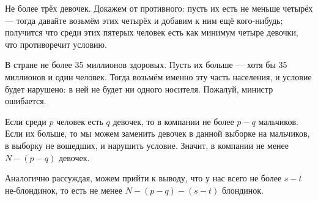 \begin{itemize}
\itA Не более трёх девочек. Докажем от противного: пусть их есть не меньше четырёх --- 
тогда давайте возьмём этих четырёх и добавим к ним ещё кого-нибудь; получится что  
среди этих пятерых человек есть как минимум четыре девочки, что противоречит условию.

\itB В стране не более 35 миллионов здоровых. Пусть их больше --- хотя бы 35 миллионов и один 
человек. Тогда возьмём именно эту часть населения, и условие будет нарушено: в ней
не будет ни одного носителя. Пожалуй, министр ошибается.

\itC Если среди $p$ человек есть $q$ девочек, то в компании не более $p-q$ мальчиков. 
Если их больше, то мы можем заменить девочек в данной выборке на мальчиков, в выборку
не вошедших, и нарушить условие. Значит, в компании не менее $N-(p-q)$ девочек.

Аналогично рассуждая, можем прийти к выводу, что у нас всего не более $s-t$ не-блондинок, 
то есть не менее $N-(p-q)-(s-t)$ блондинок.
\end{itemize}
